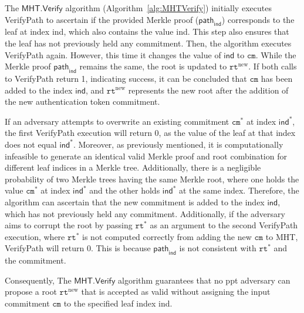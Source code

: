 	The $\textsf{MHT}.\textsf{Verify}$ algorithm (Algorithm~\ref{alg:ٰMHTVerify}) initially executes \textsf{VerifyPath}  to ascertain if the provided Merkle proof ($\textsf{path}_\mathsf{ind}$) corresponds to  the leaf at index \textsf{ind}, which also contains the value \textsf{ind}. This step also ensures that the leaf has not previously held any commitment. Then, the algorithm executes \textsf{VerifyPath} again. However, this time it changes the value of $\textsf{ind}$ to $\texttt{cm}$. While the Merkle proof $\textsf{path}_\mathsf{ind}$ remains the same, the root is updated to $\texttt{rt}^\text{new}$.  If both calls to \textsf{VerifyPath} return 1, indicating success, it can be concluded that $\texttt{cm}$ has been added to the index $\textsf{ind}$, and $\texttt{rt}^\text{new}$ represents the new root after the addition of the new authentication token commitment.

    If an adversary attempts to overwrite an existing commitment $\texttt{cm}^*$ at index $\textsf{ind}^*$, the first \textsf{VerifyPath} execution will return 0, as the value of the leaf at that index does not equal $\textsf{ind}^*$. Moreover, as previously mentioned, it is computationally infeasible to generate an identical valid Merkle proof and root combination for different leaf indices in a Merkle tree. Additionally, there is a negligible probability of two Merkle trees having the same Merkle root, where one holds the value $\texttt{cm}^*$ at index $\textsf{ind}^*$ and the other holds $\textsf{ind}^*$ at the same index. Therefore, the algorithm can ascertain that the new commitment is added to the index $\textsf{ind}$, which has not previously held any commitment. Additionally, if the adversary aims to corrupt the root by passing $\texttt{rt}^{*}$ as an argument to the second \textsf{VerifyPath} execution, where $\texttt{rt}^{*}$ is not computed correctly from adding the new $\texttt{cm}$ to \textsf{MHT}, \textsf{VerifyPath} will return 0. This is because $\textsf{path}_\mathsf{ind}$ is not consistent with $\texttt{rt}^{*}$ and the commitment.
    
    Consequently, The $\textsf{MHT}.\textsf{Verify}$ algorithm guarantees that no \gls{ppt} adversary can propose a root $\texttt{rt}^\text{new}$ that is accepted as valid without assigning the input commitment $\texttt{cm}$ to the specified leaf index \textsf{ind}.

